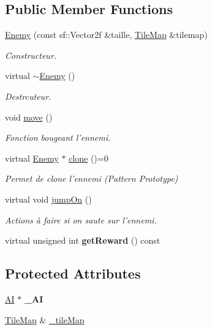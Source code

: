 \subsection*{Public Member Functions}
\begin{DoxyCompactItemize}
\item 
\hyperlink{class_enemy_aa89c4b47d518fe6aa5e84b059b19a3b0}{Enemy} (const sf\+::\+Vector2f \&taille, \hyperlink{class_tile_map}{Tile\+Map} \&tilemap)
\begin{DoxyCompactList}\small\item\em Constructeur. \end{DoxyCompactList}\item 
virtual \hyperlink{class_enemy_a065a22a70c78bfc03da4c032312c6da5}{$\sim$\+Enemy} ()
\begin{DoxyCompactList}\small\item\em Destrcuteur. \end{DoxyCompactList}\item 
void \hyperlink{class_enemy_a9a398f8d12234f02563b27440aff7891}{move} ()
\begin{DoxyCompactList}\small\item\em Fonction bougeant l'ennemi. \end{DoxyCompactList}\item 
virtual \hyperlink{class_enemy}{Enemy} $\ast$ \hyperlink{class_enemy_a21d5d2f97aa7406a985fd0ca3f3b1028}{clone} ()=0
\begin{DoxyCompactList}\small\item\em Permet de clone l'ennemi (Pattern Prototype) \end{DoxyCompactList}\item 
virtual void \hyperlink{class_enemy_a85c7ff8dc9f54c92d7583c0d196d37d2}{jump\+On} ()
\begin{DoxyCompactList}\small\item\em Actions à faire si on saute sur l'ennemi. \end{DoxyCompactList}\item 
\hypertarget{class_enemy_a17fc0ab57aa01933301df1f7ced16b21}{virtual unsigned int {\bfseries get\+Reward} () const }\label{class_enemy_a17fc0ab57aa01933301df1f7ced16b21}

\end{DoxyCompactItemize}
\subsection*{Protected Attributes}
\begin{DoxyCompactItemize}
\item 
\hypertarget{class_enemy_a696bc97bd2f755fe2730d1a84602666b}{\hyperlink{class_a_i}{A\+I} $\ast$ {\bfseries \+\_\+\+A\+I}}\label{class_enemy_a696bc97bd2f755fe2730d1a84602666b}

\item 
\hyperlink{class_tile_map}{Tile\+Map} \& \hyperlink{class_enemy_a25c3a0c770a6cf5ae9cd9e4d71968aff}{\+\_\+tile\+Map}
\end{DoxyCompactItemize}


